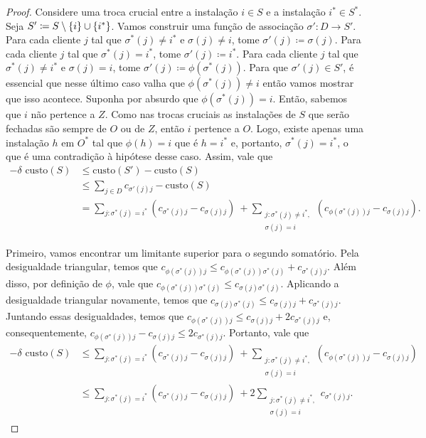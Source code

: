 \begin{proof}
Considere uma troca crucial entre a instalação $i \in S$ e a instalação $ i^* \in S^*$. Seja $S' \coloneqq S \setminus \{i\} \cup \{i^*\}$. Vamos construir uma função de associação $\sigma' : D \rightarrow S'$. Para cada cliente $j$ tal que $\sigma^*(j) \neq i^*$ e $\sigma(j) \neq i$, tome $\sigma'(j) \coloneqq \sigma(j)$. Para cada cliente $j$ tal que $\sigma^*(j) = i^*$, tome $\sigma'(j)\coloneqq i^*$. Para cada cliente $j$ tal que $\sigma^*(j) \neq i^*$ e $\sigma(j)=i$, tome $\sigma'(j) \coloneqq \phi(\sigma^*(j))$. Para que $\sigma'(j) \in S'$, é essencial que nesse último caso valha que $\phi(\sigma^*(j)) \neq i$ então vamos mostrar que isso acontece. Suponha por absurdo que $\phi(\sigma^*(j))=i$. Então, sabemos que $i$ não pertence a $Z$. Como nas trocas cruciais as instalações de $S$ que serão fechadas são sempre de $O$ ou de $Z$, então $i$ pertence a $O$. Logo, existe apenas uma instalação $h$ em $O^*$ tal que $\phi(h) = i$ que é $h = i^*$ e, portanto, $\sigma^*(j) = i^*$, o que é uma contradição à hipótese desse caso. Assim, vale que 
\begin{subequations}
    \begin{align*}
        - \delta \text{ custo}(S)&\leq \text{custo}(S') - \text{custo}(S)  \\
        &\leq \sum_{j \in D} c_{\sigma'(j)j} - \text{custo}(S) \\
        &= \sum_{j:\sigma^*(j) = i^*} (c_{\sigma^*(j)j} - c_{\sigma(j)j}) \ + \sum_{\substack{j : \sigma^*(j)\neq i^*,\\ \sigma(j) = i}} (c_{\phi(\sigma^*(j))j} - c_{\sigma(j)j}).
    \end{align*}
\end{subequations}

Primeiro, vamos encontrar um limitante superior para o segundo somatório. Pela desigualdade triangular, temos que $c_{\phi(\sigma^*(j))j} \leq c_{\phi(\sigma^*(j))\sigma^*(j)}+c_{\sigma^*(j)j}$. Além disso, por definição de $\phi$, vale que $c_{\phi(\sigma^*(j))\sigma^*(j)}\leq c_{\sigma(j)\sigma^*(j)}$. Aplicando a desigualdade triangular novamente, temos que $c_{\sigma(j)\sigma^*(j)} \leq c_{\sigma(j)j} + c_{\sigma^*(j)j}$. Juntando essas desigualdades, temos que $c_{\phi(\sigma^*(j))j} \leq c_{\sigma(j)j} + 2c_{\sigma^*(j)j}$ e, consequentemente, $c_{\phi(\sigma^*(j))j} - c_{\sigma(j)j} \leq 2c_{\sigma^*(j)j}$. Portanto, vale que
\begin{subequations}
\begin{align*}
    - \delta \text{ custo}(S) &\leq \sum_{j:\sigma^*(j) = i^*} (c_{\sigma^*(j)j} - c_{\sigma(j)j}) \ + \sum_{\substack{j : \sigma^*(j)\neq i^*, \\ \sigma(j) = i}} (c_{\phi(\sigma^*(j))j} - c_{\sigma(j)j}) \\
    &\leq \sum_{j:\sigma^*(j) = i^*} (c_{\sigma^*(j)j} - c_{\sigma(j)j}) \ + 2\sum_{\substack{j : \sigma^*(j)\neq i^*,\\ \sigma(j) = i}} c_{\sigma^*(j)j}.
\end{align*}
\end{subequations}



\end{proof}
